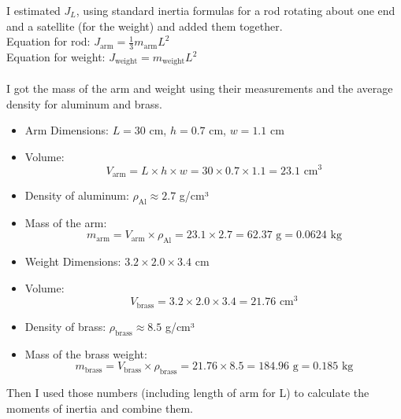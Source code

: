 \documentclass{article}
\begin{document}
I estimated $J_L$, using standard inertia formulas for a rod rotating about one end and a satellite (for the weight) and added them together.
\\
Equation for rod:
$J_{\text{arm}} = \frac{1}{3} m_{\text{arm}} L^2$
\\
Equation for weight:
$J_{\text{weight}} = m_{\text{weight}} L^2$
\\
\\
I got the mass of the arm and weight using their measurements and the average density for aluminum and brass.
\begin{itemize}
    \item Arm Dimensions: \( L = 30 \) cm, \( h = 0.7 \) cm, \( w = 1.1 \) cm
    \item Volume:
    \begin{equation}
        V_{\text{arm}} = L \times h \times w = 30 \times 0.7 \times 1.1 = 23.1 \text{ cm}^3
    \end{equation}
    \item Density of aluminum: \( \rho_{\text{Al}} \approx 2.7 \) g/cm³
    \item Mass of the arm:
    \begin{equation}
        m_{\text{arm}} = V_{\text{arm}} \times \rho_{\text{Al}} = 23.1 \times 2.7 = 62.37 \text{ g} = 0.0624 \text{ kg}
    \end{equation}
\end{itemize}

\begin{itemize}
    \item Weight Dimensions: \( 3.2 \times 2.0 \times 3.4 \) cm
    \item Volume:
    \begin{equation}
        V_{\text{brass}} = 3.2 \times 2.0 \times 3.4 = 21.76 \text{ cm}^3
    \end{equation}
    \item Density of brass: \( \rho_{\text{brass}} \approx 8.5 \) g/cm³
    \item Mass of the brass weight:
    \begin{equation}
        m_{\text{brass}} = V_{\text{brass}} \times \rho_{\text{brass}} = 21.76 \times 8.5 = 184.96 \text{ g} = 0.185 \text{ kg}
    \end{equation}
\end{itemize}

Then I used those numbers (including length of arm for L) to calculate the moments of inertia and combine them.
\end{document}
